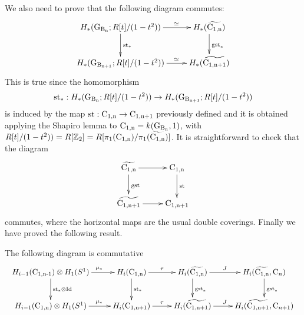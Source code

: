 We also need to prove that the following diagram commutes:
$$
\xymatrix{
	H_*(\Gb{n};\ring[t]/(1-t^2)) \ar[d]^{\stab_*} \ar[r]^(0.63){\simeq}& H_*(\confmd{n}) \ar[d]^{\gstab_*}\\
	H_*(\Gb{n+1};\ring[t]/(1-t^2))  \ar[r]^(0.63){\simeq} & H_*(\confmd{n+1})
}
$$
This is true since the homomorphism $$\mathrm{st}_*:H_*(\operatorname{G_{B_{n}}};R[t]/(1-t^2)) \to H_*(\operatorname{G_{B_{n+1}}};R[t]/(1-t^2))$$ is induced by the map $\mathrm{st}: \operatorname{C_{1,n}} \to \operatorname{C_{1,n+1}}$ previously defined and it is obtained applying the Shapiro lemma to $\operatorname{C_{1,n}} = k(\operatorname{G_{B_{n}}},1)$, with $R[t]/(1-t^2)) = R[\mathbb{Z}_2] = R[\pi_1(\operatorname{C_{1,n}})/\pi_1(\widetilde{\operatorname{C_{1,n}}})]$.
It is straightforward to check that the diagram
$$
\xymatrix{
 \confmd{n} \ar[d]^\gstab \ar[r]& 	\confm{n}\ar[d]^{\stab} \\
 \confmd{n+1} \ar[r] & 	\confm{n+1}
}
$$
commutes, where the horizontal maps are the usual double coverings. Finally we have proved the following result.
\begin{lem}\label{lem:commutative_stab}
The following diagram is commutative
\begin{equation}\label{diag:stabilization}
\begin{tabular}{c}
\xymatrix @R=2pc @C=2pc {
H_{i-1}(\confm{n-1}) \otimes H_1(S^1) \ar[d]^{\stab_* \otimes \Id} \ar[r]^(0.6){\mu_*}  &	H_i(\confm{n}) \ar[r]^{\tau} \ar[d]^{\stab_*} &H_i(\confmd{n})  \ar[r]^(0.45)J \ar[d]^{\gstab_*}& H_i(\confmd{n}, \conf_n) \ar[d]^{\gstab_*} \\
H_{i-1}(\confm{n}) \otimes H_1(S^1) \ar[r]^(0.6){\mu_*}  &	H_i(\confm{n+1}) \ar[r]^{\tau} &H_i(\confmd{n+1})  \ar[r]^(0.45)J & H_i(\confmd{n+1}, \conf_{n+1}) 
}
\end{tabular}
\end{equation}
\end{lem}

